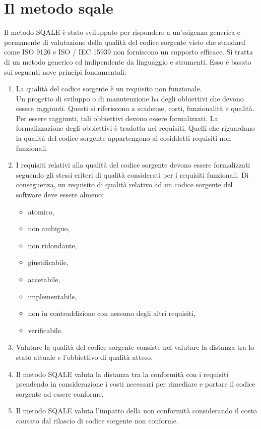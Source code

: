 \section{Il metodo sqale}
Il metodo SQALE è stato sviluppato per rispondere a un'esigenza generica e permanente di valutazione della qualità del codice sorgente visto che standard come ISO 9126 e ISO / IEC 15939 non forniscono un supporto efficace. Si tratta di un metodo generico ed indipendente da linguaggio e strumenti.
Esso è basato sui seguenti nove principi fondamentali:
\begin{enumerate}
	\item La qualità del codice sorgente è un requisito non funzionale. \\ Un progetto di sviluppo o di manutenzione ha degli obbiettivi che devono essere raggiunti. Questi si riferiscono a scadenze, costi, funzionalità e qualità. Per essere raggiunti, tali obbiettivi devono essere formalizzati. La formalizzazione degli obbiettivi è tradotta nei requisiti. Quelli che riguardano la qualità del codice sorgente appartengono ai cosiddetti requisiti non funzionali.
	\item I requisiti relativi alla qualità del codice sorgente devono essere formalizzati seguendo gli stessi criteri di qualità considerati per i requisiti funzionali. Di conseguenza, un requisito di qualità relativo ad un codice sorgente del software deve essere almeno:
	\begin{itemize}
		\item atomico,
		\item non ambiguo,
		\item non ridondante,
		\item giustificabile,
		\item accetabile,
		\item implementabile,
		\item non in contraddizione con nessuno degli altri requisiti,
		\item verificabile.
	\end{itemize}
	\item Valutare la qualità del codice sorgente consiste nel valutare la distanza tra lo stato attuale e l’obbiettivo di qualità atteso.
	\item Il metodo SQALE valuta la distanza tra la conformità con i requisiti prendendo in considerazione i costi necessari per rimediare e portare il codice sorgente ad essere conforme.
	\item Il metodo SQALE valuta l’impatto della non conformità considerando il costo causato dal rilascio di codice sorgente non conforme.

\end{enumerate}
